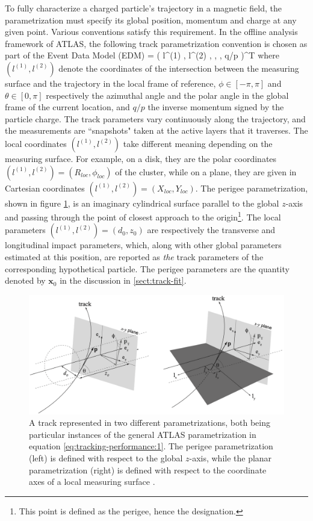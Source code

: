 To fully characterize a charged particle's trajectory in a magnetic field, the parametrization must specify its global position, momentum and charge at any given point. 
Various conventions satisfy this requirement. 
In the offline analysis framework of ATLAS, the following track parametrization convention is chosen as part of the Event Data Model (EDM) \cite{ATL-SOFT-PUB-2006-004}
\beq
\label{eq:tracking-performance:1}
 = (
    l^{(1)} , l^{(2)} , \phi , \theta , q/p 
)^T
\eeq
where $(l^{(1)}, l^{(2)})$ denote the coordinates of the intersection between the measuring surface and the trajectory in the local frame of reference, $\phi \in [-\pi, \pi]$ and $\theta \in [0, \pi]$ respectively the azimuthal angle and the polar angle in the global frame of the current location, and $q/p$ the inverse momentum signed by the particle charge. 
The track parameters vary continuously along the trajectory, and the measurements are ``snapshots" taken at the active layers that it traverses. 
The local coordinates $(l^{(1)}, l^{(2)})$ take different meaning depending on the measuring surface. 
For example, on a disk, they are the polar coordinates $(l^{(1)}, l^{(2)}) = (R_{loc}, \phi_{loc})$ of the cluster, while on a plane, they are given in Cartesian coordinates $(l^{(1)}, l^{(2)}) = (X_{loc}, Y_{loc})$.
The perigee parametrization, shown in figure \ref{fig:track-param}, is an imaginary cylindrical surface parallel to the global $z$-axis and passing through the point of closest approach to the origin\footnote{This point is defined as the perigee, hence the designation.}.
The local parameters $(l^{(1)}, l^{(2)}) = (d_0, z_0)$ are respectively the transverse and longitudinal impact parameters, which, along with other global parameters estimated at this position, are reported as \textit{the} track parameters of the corresponding hypothetical particle. 
The perigee parameters are the quantity denoted by $\mathbf{x}_0$ in the discussion in \ref{sect:track-fit}.

\begin{figure}[h!]
    \centering
    \includegraphics[width=\textwidth]{figures/track-param.png}
    \caption{A track represented in two different parametrizations, both being particular instances of the general ATLAS parametrization in equation \eqref{eq:tracking-performance:1}. The perigee parametrization (left) is defined with respect to the global $z$-axis, while the planar parametrization (right) is defined with respect to the coordinate axes of a local measuring surface \cite{ATL-SOFT-PUB-2007-003}.}
    \label{fig:track-param}
\end{figure}

